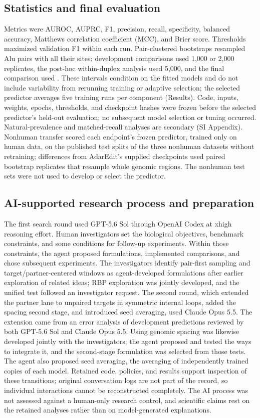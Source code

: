 \documentclass[9pt,twocolumn,twoside]{pnas-new}
\begin{document}
{\subsection*{Statistics and final evaluation}
Metrics were AUROC, AUPRC, F1, precision, recall, specificity, balanced accuracy, Matthews correlation coefficient (MCC), and Brier score. Thresholds maximized validation F1 within each run. Pair-clustered bootstraps resampled Alu pairs with all their sites: development comparisons used 1,000 or 2,000 replicates, the post-hoc within-duplex analysis used 5,000, and the final comparison used \NBootstrapReplicates{}. These intervals condition on the fitted models and do not include variability from rerunning training or adaptive selection; the selected predictor averages five training runs per component (Results). Code, inputs, weights, epochs, thresholds, and checkpoint hashes were frozen before the selected predictor's held-out evaluation; no subsequent model selection or tuning occurred. Natural-prevalence and matched-recall analyses are secondary (SI Appendix). Nonhuman transfer scored each endpoint's frozen predictor, trained only on human data, on the published test splits of the three nonhuman datasets without retraining; differences from AdarEdit's supplied checkpoints used \NonhumanBootstrapReplicates{} paired bootstrap replicates that resample whole genomic regions. The nonhuman test sets were not used to develop or select the predictor.

\subsection*{AI-supported research process and preparation}
The first search round used GPT-5.6 Sol through OpenAI Codex at xhigh reasoning effort. Human investigators set the biological objectives, benchmark constraints, and some conditions for follow-up experiments. Within those constraints, the agent proposed formulations, implemented comparisons, and chose subsequent experiments. The investigators identify pair-first sampling and target/partner-centered windows as agent-developed formulations after earlier exploration of related ideas; RBP exploration was jointly developed, and the unified test followed an investigator request. The second round, which extended the partner lane to unpaired targets in symmetric internal loops, added the spacing second stage, and introduced seed averaging, used Claude Opus 5.5. The extension came from an error analysis of development predictions reviewed by both GPT-5.6 Sol and Claude Opus 5.5. Using genomic spacing was likewise developed jointly with the investigators; the agent proposed and tested the ways to integrate it, and the second-stage formulation was selected from those tests. The agent also proposed seed averaging, the averaging of independently trained copies of each model. Retained code, policies, and results support inspection of these transitions; original conversation logs are not part of the record, so individual interactions cannot be reconstructed completely. The AI process was not assessed against a human-only research control, and scientific claims rest on the retained analyses rather than on model-generated explanations.

}
\end{document}
